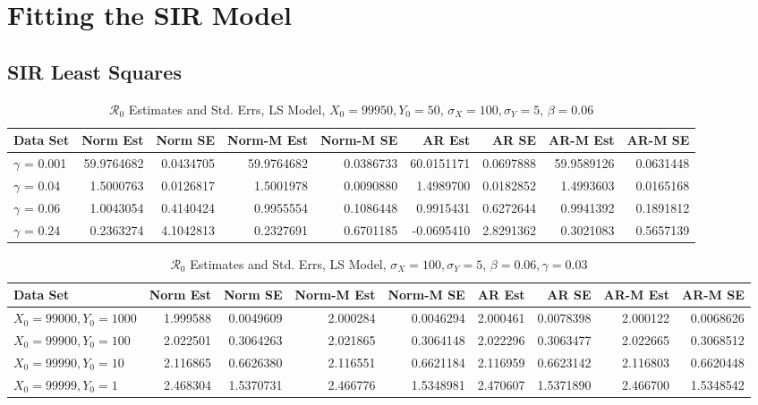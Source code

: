 \documentclass[12pt]{article}
\newcommand{\rr}{\ensuremath{\mathcal{R}_0}}
\begin{document}
\section{Fitting the SIR Model}

\subsection{SIR Least Squares}


\begin{table}[H]
	
	\caption{\label{tab:}$\rr$ Estimates and Std. Errs, LS Model,
		$X_0 = 99950, Y_0 = 50$, $\sigma_X = 100, \sigma_Y = 5$, $\beta = 0.06$}
	\centering
	\begin{footnotesize}
		\begin{tabular}[t]{l|r|r|r|r|r|r|r|r}
			\hline
			Data Set & Norm Est & Norm SE & Norm-M Est & Norm-M SE & AR Est & AR SE & AR-M Est & AR-M SE\\
			\hline
			$\gamma$ = 0.001 & 59.9764682 & 0.0434705 & 59.9764682 & 0.0386733 & 60.0151171 & 0.0697888 & 59.9589126 & 0.0631448\\
			\hline
			$\gamma$ = 0.04 & 1.5000763 & 0.0126817 & 1.5001978 & 0.0090880 & 1.4989700 & 0.0182852 & 1.4993603 & 0.0165168\\
			\hline
			$\gamma$ = 0.06 & 1.0043054 & 0.4140424 & 0.9955554 & 0.1086448 & 0.9915431 & 0.6272644 & 0.9941392 & 0.1891812\\
			\hline
			$\gamma$ = 0.24 & 0.2363274 & 4.1042813 & 0.2327691 & 0.6701185 & -0.0695410 & 2.8291362 & 0.3021083 & 0.5657139\\
			\hline
		\end{tabular}
	\end{footnotesize}
\end{table}

\begin{table}[H]
	
	\caption{\label{tab:}$\rr$ Estimates and Std. Errs, LS Model,
		$\sigma_X = 100, \sigma_Y = 5$, $\beta = 0.06, \gamma = 0.03$}
	\centering
	\begin{footnotesize}
		\begin{tabular}[t]{l|r|r|r|r|r|r|r|r}
			\hline
			Data Set & Norm Est & Norm SE & Norm-M Est & Norm-M SE & AR Est & AR SE & AR-M Est & AR-M SE\\
			\hline
			$X_0 = 99000, Y_0 = 1000$ & 1.999588 & 0.0049609 & 2.000284 & 0.0046294 & 2.000461 & 0.0078398 & 2.000122 & 0.0068626\\
			\hline
			$X_0 = 99900, Y_0 = 100$ & 2.022501 & 0.3064263 & 2.021865 & 0.3064148 & 2.022296 & 0.3063477 & 2.022665 & 0.3068512\\
			\hline
			$X_0 = 99990, Y_0 = 10$ & 2.116865 & 0.6626380 & 2.116551 & 0.6621184 & 2.116959 & 0.6623142 & 2.116803 & 0.6620448\\
			\hline
			$X_0 = 99999, Y_0 = 1$ & 2.468304 & 1.5370731 & 2.466776 & 1.5348981 & 2.470607 & 1.5371890 & 2.466700 & 1.5348542\\
			\hline
		\end{tabular}
	\end{footnotesize}
\end{table}
\end{document}

